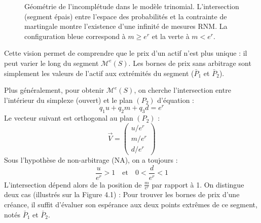 \begin{figure}[H]
\caption{Géométrie de l'incomplétude dans le modèle trinomial. L'intersection (segment épais) entre l'espace des probabilités et la contrainte de martingale montre l'existence d'une infinité de mesures RNM. La configuration bleue correspond à $m \ge e^r$ et la verte à $m < e^r$.}
\end{figure}

\begin{tcolorbox}[title=L'intérêt de la vision géométrique, colback=red!5!white, colframe=red!50!black]
Cette vision permet de comprendre que le prix d'un actif n'est plus unique : il peut varier le long du segment $\mathcal{M}^e(S)$. Les bornes de prix sans arbitrage sont simplement les valeurs de l'actif aux extrémités du segment ($\bar{P}_1$ et $\bar{P}_2$).
\end{tcolorbox}

Plus généralement, pour obtenir $\mathcal{M}^e(S)$, on cherche l'intersection entre l'intérieur du simplexe (ouvert) et le plan $(P_2)$ d'équation :
\begin{equation}
    q_1 u + q_2 m + q_3 d = e^r
\end{equation}
Le vecteur suivant est orthogonal au plan $(P_2)$ :
\begin{equation}
    \vec{V} = \begin{pmatrix} u/e^r \\ m/e^r \\ d/e^r \end{pmatrix}
\end{equation}
Sous l'hypothèse de non-arbitrage (NA), on a toujours :
\begin{equation}
    \frac{u}{e^r} > 1 \quad \text{et} \quad 0 < \frac{d}{e^r} < 1
\end{equation}
L'intersection dépend alors de la position de $\frac{m}{e^r}$ par rapport à 1. On distingue deux cas (illustrés sur la Figure 4.1) :
Pour trouver les bornes de prix d'une créance, il suffit d'évaluer son espérance aux deux points extrêmes de ce segment, notés $\bar{P}_1$ et $\bar{P}_2$.

